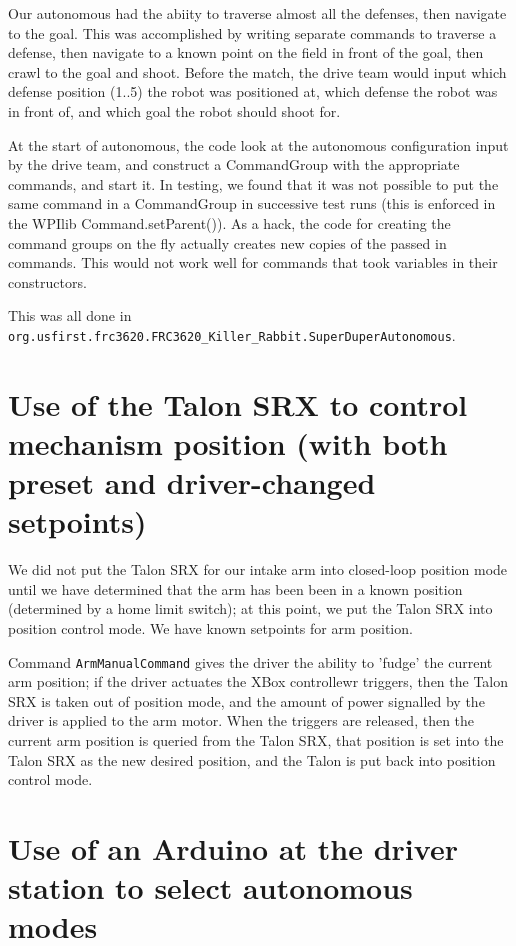 \documentclass[]{article}
\begin{document}
Our autonomous had the abiity to traverse almost all the defenses, then navigate to the goal. This was accomplished by writing separate commands to traverse a defense, then navigate to a known point on the field in front of the goal, then crawl to the goal and shoot. Before the match, the drive team would input which defense position (1..5) the robot was positioned at, which defense the robot was in front of, and which goal the robot should shoot for.

At the start of autonomous, the code look at the autonomous configuration input by the drive team, and construct a CommandGroup with the appropriate commands, and start it. In testing, we found that it was not possible to put the same command in a CommandGroup in successive test runs (this is enforced in the WPIlib Command.setParent()). As a hack, the code for creating the command groups on the fly actually creates new copies of the passed in commands. This would not work well for commands that took variables in their constructors. 

This was all done in \texttt{org.usfirst.frc3620.FRC3620\_Killer\_Rabbit.SuperDuperAutonomous}.

\section {Use of the Talon SRX to control mechanism position (with both preset and driver-changed setpoints)}

We did not put the Talon SRX for our intake arm into closed-loop position mode until we have determined that the arm has been been in a known position (determined by a home limit switch); at this point, we put the Talon SRX into position control mode. We have known setpoints for arm position.

Command \texttt{ArmManualCommand} gives the driver the ability to 'fudge' the current arm position; if the driver actuates the XBox controllewr triggers, then the Talon SRX is taken out of position mode, and the amount of power signalled by the driver is applied to the arm motor.
When the triggers are released, then the current arm position is queried from the Talon SRX, that position is set into the Talon SRX as the new desired position, and the Talon is put back into position control mode.

\section {Use of an Arduino at the driver station to select autonomous modes}
\end{document}
